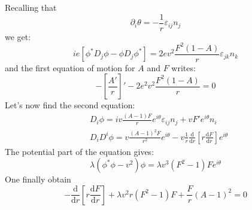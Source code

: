 Recalling that
\begin{equation}
  \partial_i\theta = -\frac{1}{r}\varepsilon_{ij}n_j
\end{equation}
we get:
\begin{equation}
  ie\left[\phi^*D_j\phi-\phi D_j\phi^*\right] = 2ev^2\frac{F^2(1-A)}{r}\varepsilon_{jk}n_k
\end{equation}
and the first equation of motion for $A$ and $F$ writes:
\begin{equation}
  -\left[\frac{A'}{r}\right]' - 2e^2v^2\frac{F^2(1-A)}{r} = 0
\end{equation}
Let's now find the second equation:
\begin{align}
  &D_i\phi = iv\frac{(A-1)F}{r}e^{i\theta}\varepsilon_{ij}n_j+vF'e^{i\theta}n_i\\
  &D_iD^i\phi = v\frac{(A-1)^2F}{r^2}e^{i\theta}-v\frac{1}{r}\frac{\mathrm d}{\mathrm d r}\left[r\frac{\mathrm d F}{\mathrm d r}\right]e^{i\theta}
\end{align}
The potential part of the equation gives:
\begin{equation}
  \lambda\left(\phi^*\phi-v^2\right)\phi = \lambda v^3(F^2-1)Fe^{i\theta}
\end{equation}
One finally obtain
\begin{equation}
  -\frac{\mathrm d}{\mathrm d r}\left[r\frac{\mathrm d F}{\mathrm dr}\right]+\lambda v^2 r (F^2-1)F+ \frac{F}{r}(A-1)^2 = 0
\end{equation}

